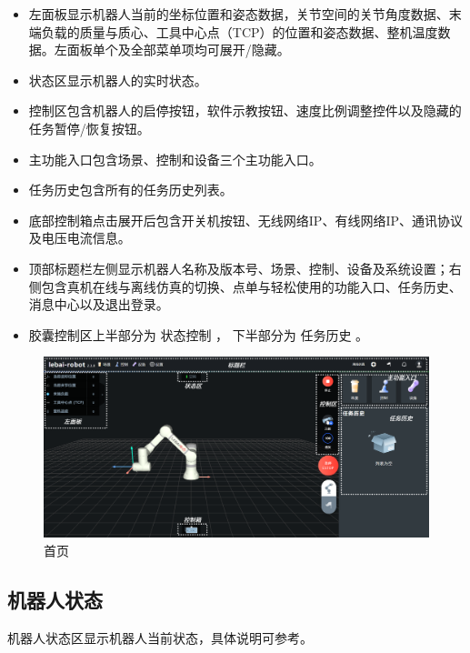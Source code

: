 \begin{itemize}
	\item 左面板显示机器人当前的坐标位置和姿态数据，关节空间的关节角度数据、末端负载的质量与质心、工具中心点（TCP）的位置和姿态数据、整机温度数据。左面板单个及全部菜单项均可展开/隐藏。
	\item 状态区显示机器人的实时状态。 
	\item 控制区包含机器人的启停按钮，软件示教按钮、速度比例调整控件以及隐藏的任务暂停/恢复按钮。 
	\item 主功能入口包含场景、控制和设备三个主功能入口。 
	\item 任务历史包含所有的任务历史列表。 
	\item 底部控制箱点击展开后包含开关机按钮、无线网络IP、有线网络IP、通讯协议及电压电流信息。
	\item 顶部标题栏左侧显示机器人名称及版本号、场景、控制、设备及系统设置；右侧包含真机在线与离线仿真的切换、点单与轻松使用的功能入口、任务历史、消息中心以及退出登录。 
	\item 胶囊控制区上半部分为 状态控制 ， 下半部分为 任务历史 。	
\end{itemize}

\begin{figure}[ht]
	\centering
	\includegraphics[width=\textwidth]{image/07/图2.10 首页 .png}
	\caption{\LM 首页}
	\label{fig:LM首页}
\end{figure}


\subsection{机器人状态}

机器人状态区显示机器人当前状态，具体说明可参考。

